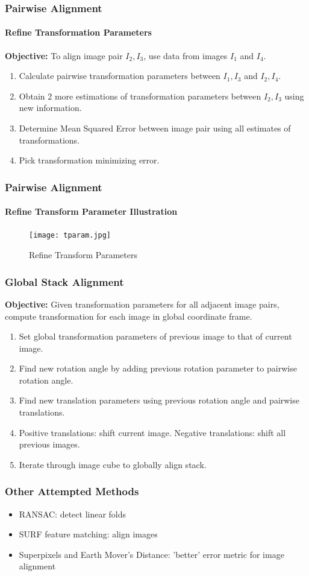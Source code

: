 \documentclass{beamer}
\begin{document}
\begin{frame}
\frametitle{Pairwise Alignment}
\framesubtitle{Refine Transformation Parameters}
\textbf{Objective:} To align image pair $I_2, I_3$, use data from images $I_1$ and $I_4$. \\
\begin{enumerate}
\item Calculate pairwise transformation parameters between $I_1,I_3$ and $I_2,I_4$.
\item Obtain 2 more estimations of transformation parameters between $I_2,I_3$ using new information.
\item Determine Mean Squared Error between image pair using all estimates of transformations.
\item Pick transformation minimizing error.
\end{enumerate}
\end{frame}

\begin{frame}
\frametitle{Pairwise Alignment}
\framesubtitle{Refine Transform Parameter Illustration}
\begin{figure}[p]
	\centering
	\texttt{[image: tparam.jpg]}
	\caption{Refine Transform Parameters}
\end{figure}
\end{frame}

\begin{frame}
\frametitle{Global Stack Alignment}
\textbf{Objective:} Given transformation parameters for all adjacent image pairs, compute transformation for each image in global coordinate frame.
\begin{enumerate}
\item Set global transformation parameters of previous image to that of current image. 
\item Find new rotation angle by adding previous rotation parameter to pairwise rotation angle. 
\item Find new translation parameters using previous rotation angle and pairwise translations.
\item Positive translations: shift current image. Negative translations: shift all previous images.
\item Iterate through image cube to globally align stack. 
\end{enumerate}
\end{frame}

\begin{frame}
\frametitle{Other Attempted Methods}
\begin{itemize}
\item RANSAC: detect linear folds
\item SURF feature matching: align images
\item Superpixels and Earth Mover's Distance: 'better' error metric for image alignment
\end{itemize}
\end{frame}
\end{document}

